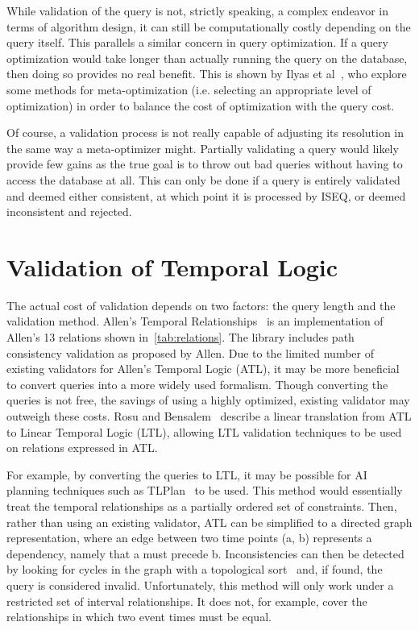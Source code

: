 \documentclass{acm_proc_article-sp}
\begin{document}
While validation of the query is not, strictly speaking, a complex endeavor in terms of algorithm design, it can still be computationally costly depending on the query itself.  This parallels a similar concern in query optimization.  If a query optimization would take longer than actually running the query on the database, then doing so  provides no real benefit.  This is shown by Ilyas et al~\cite{Ilyas:2003}, who explore some methods for meta-optimization (i.e. selecting an appropriate level of optimization) in order to balance the cost of optimization with the query cost.

Of course, a validation process is not really capable of adjusting its resolution in the same way a meta-optimizer might.  Partially validating a query would likely provide few gains as the true goal is to throw out bad queries without having to access the database at all.  This can only be done if a query is entirely validated and deemed either consistent, at which point it is processed by ISEQ, or deemed inconsistent and rejected.

\section{Validation of Temporal Logic}
The actual cost of validation depends on two factors: the query length and the validation method. Allen's Temporal Relationships~\cite{Franke:2011} is an implementation of Allen's 13 relations shown in~\ref{tab:relations}. The library includes path consistency validation as proposed by Allen.
Due to the limited number of existing validators for Allen's Temporal Logic (ATL), it may be more beneficial to convert queries into a more widely used formalism. Though converting the queries is not free, the savings of using a highly optimized, existing validator may outweigh these costs. Rosu and Bensalem~\cite{Rosu:2006} describe a linear translation from ATL to Linear Temporal Logic (LTL), allowing LTL validation techniques to be used on relations expressed in ATL. 

For example, by converting the queries to LTL, it may be possible for AI planning techniques such as TLPlan~\cite{Bacchus:1998} to be used.  This method would essentially treat the temporal relationships as a partially ordered set of constraints.  Then, rather than using an existing validator, ATL can be simplified to a directed graph representation, where an edge between two time points (a, b) represents a dependency, namely that a must precede b.  Inconsistencies can then be detected by looking for cycles in the graph with a topological sort~\cite{Pearce:2004} and, if found, the query is considered invalid.  Unfortunately, this method will only work under a restricted set of interval relationships.  It does not, for example, cover the relationships in which two event times must be equal.
\end{document}
